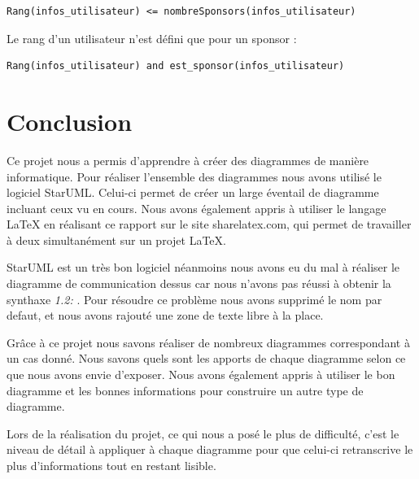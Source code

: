 \documentclass[11pt,a4paper]{article}
\begin{document}
\begin{lstlisting}
Rang(infos_utilisateur) <= nombreSponsors(infos_utilisateur)
\end{lstlisting}

\vspace{1cm}

Le rang d’un utilisateur n’est défini que pour un sponsor : 

\begin{lstlisting}
Rang(infos_utilisateur) and est_sponsor(infos_utilisateur)
\end{lstlisting}

\newpage


\section{Conclusion}
Ce projet nous a permis d'apprendre à créer des diagrammes de
manière informatique. Pour réaliser l'ensemble des diagrammes
nous avons utilisé le logiciel StarUML. Celui-ci permet de créer
un large éventail de diagramme incluant ceux vu en cours. Nous
avons également appris à utiliser le langage LaTeX en réalisant
ce rapport sur le site sharelatex.com, qui permet de travailler
à deux simultanément sur un projet LaTeX.

StarUML est un très bon logiciel néanmoins nous avons eu du
mal à réaliser le diagramme de communication dessus car nous
n'avons pas réussi à obtenir la synthaxe \textit{1.2:} . Pour
résoudre ce problème nous avons supprimé le nom par defaut, et
nous avons rajouté une zone de texte libre à la place.

Grâce à ce projet nous savons réaliser de nombreux diagrammes
correspondant à un cas donné. Nous savons quels sont les apports
de chaque diagramme selon ce que nous avons envie d'exposer.
Nous avons également appris à utiliser le bon diagramme et
les bonnes informations pour construire un autre type de 
diagramme.

Lors de la réalisation du projet, ce qui nous a posé le plus de
difficulté, c'est le niveau de détail à appliquer à chaque
diagramme pour que celui-ci retranscrive le plus d'informations
tout en restant lisible.
\end{document}
